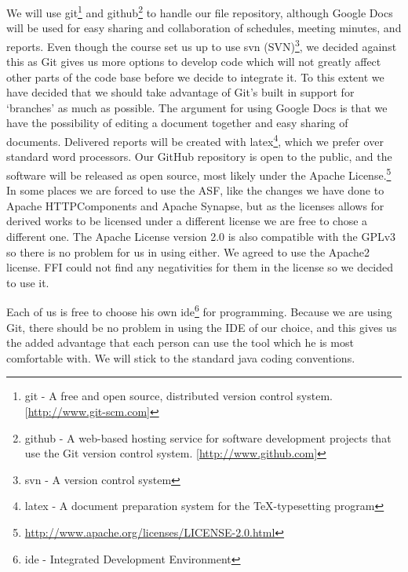     We will use \gls{git}\footnote{\gls{git} - A free and open source, distributed version control system. [\url{http://www.git-scm.com}]} and \gls{github}\footnote{\gls{github} - A web-based hosting service for software development projects that use the Git version control system. [\url{http://www.github.com}]} to handle our file repository, although Google Docs will be used for easy sharing and collaboration of schedules, meeting minutes, and reports. Even though the course set us up to use \gls{svn} (SVN)\footnote{\gls{svn} - A version control system}, we decided against this as Git gives us more options to develop code which will not greatly affect other parts of the code base before we decide to integrate it. To this extent we have decided that we should take advantage of Git’s built in support for ‘branches’ as much as possible. The argument for using Google Docs is that we have the possibility of editing a document together and easy sharing of documents. Delivered reports will be created with \gls{latex}\footnote{\gls{latex} - A document preparation system for the \TeX -typesetting program}, which we prefer over standard word processors. Our GitHub repository is open to the public, and the software will be released as open source, most likely under the Apache License.\footnote{\url{http://www.apache.org/licenses/LICENSE-2.0.html}} In some places we are forced to use the ASF, like the changes we have done to Apache HTTPComponents and Apache Synapse, but as the licenses allows for derived works to be licensed under a different license we are free to chose a different one. The Apache License version 2.0 is also compatible with the GPLv3 so there is no problem for us in using either. 
    We agreed to use the Apache2 license. FFI could not find any negativities for them in the license so we decided to use it. 

    Each of us is free to choose his own \gls{ide}\footnote{\gls{ide} - Integrated Development Environment} for programming. Because we are using Git, there should be no problem in using the IDE of our choice, and this gives us the added advantage that each person can use the tool which he is most comfortable with. We will stick to the standard \gls{java coding conventions}.
    
